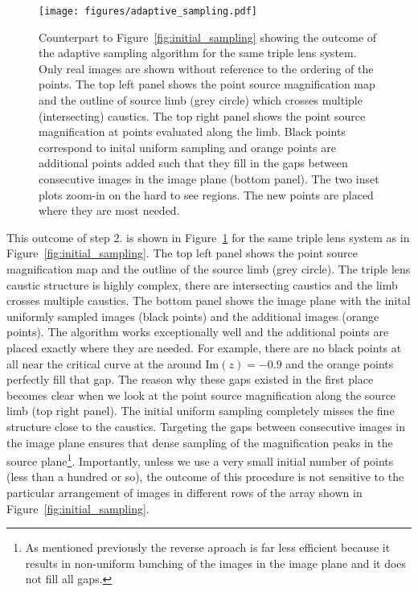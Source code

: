 \documentclass[12pt,dvipsnames]{report}
\begin{document}
\begin{figure}[!t]
    \begin{centering}
        \texttt{[image: figures/adaptive\_sampling.pdf]}
        \caption{
            Counterpart to Figure~\ref{fig:initial_sampling} showing the outcome of the
            adaptive sampling algorithm for the same triple lens system. 
            Only real images are shown without reference to the ordering of the points.
            The top left panel  shows the point source magnification map and the outline of 
            source limb (grey circle) which crosses multiple (intersecting) caustics. 
            The top right panel shows the 
            point source magnification at points evaluated along the limb. Black points correspond 
            to inital uniform sampling and orange points are additional points added such that 
            they fill in the gaps between consecutive images in the image plane (bottom panel).
            The two inset plots zoom-in on the hard to see regions. The new points are placed
            where they are most needed.}
        \label{fig:adaptive_sampling}
    \end{centering}
\end{figure}

This outcome of step 2. is shown in Figure~\ref{fig:adaptive_sampling} for the same 
triple lens system as in Figure~\ref{fig:initial_sampling}. The top left panel shows
the point source magnification map and the outline of the source limb (grey circle). The triple 
lens caustic structure is highly complex, there are intersecting caustics and the limb 
crosses multiple caustics. The bottom panel shows the image plane with the inital uniformly 
sampled images (black points) and the additional images (orange points). The algorithm 
works exceptionally well and the additional points are placed exactly where they are needed. 
For example, there are no black points at all near the critical curve at the around 
$\mathrm{Im}(z)=-0.9$ and the orange points perfectly fill that gap. The reason why these 
gaps existed in the first place becomes clear when we look at the  point source magnification 
along the source limb (top right panel). The initial uniform sampling 
completely misses the fine structure close  to the caustics. Targeting the gaps between 
consecutive images in the image plane ensures that 
dense sampling of the magnification peaks in the source plane\footnote{As mentioned previously
the reverse aproach is far less efficient because it results in non-uniform bunching of the 
images in the image plane and it does not fill all gaps.}. Importantly, unless we use a very
small initial number of points (less than a hundred or so), the outcome of this procedure is 
not sensitive  to the particular arrangement of images in different rows of the array
shown in Figure~\ref{fig:initial_sampling}.
\end{document}
